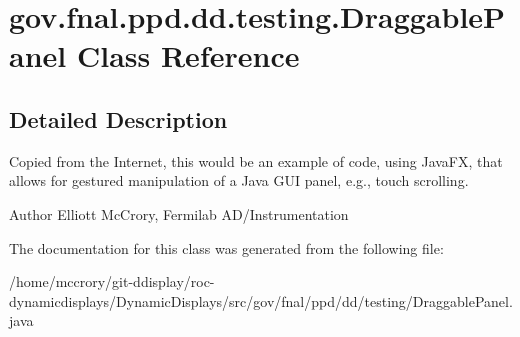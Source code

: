 \hypertarget{classgov_1_1fnal_1_1ppd_1_1dd_1_1testing_1_1DraggablePanel}{\section{gov.\-fnal.\-ppd.\-dd.\-testing.\-Draggable\-Panel Class Reference}
\label{classgov_1_1fnal_1_1ppd_1_1dd_1_1testing_1_1DraggablePanel}
}


\subsection{Detailed Description}
Copied from the Internet, this would be an example of code, using Java\-F\-X, that allows for gestured manipulation of a Java G\-U\-I panel, e.\-g., touch scrolling.

\begin{DoxyAuthor}{Author}
Elliott Mc\-Crory, Fermilab A\-D/\-Instrumentation 
\end{DoxyAuthor}


The documentation for this class was generated from the following file\-:\begin{DoxyCompactItemize}
\item 
/home/mccrory/git-\/ddisplay/roc-\/dynamicdisplays/\-Dynamic\-Displays/src/gov/fnal/ppd/dd/testing/Draggable\-Panel.\-java\end{DoxyCompactItemize}
